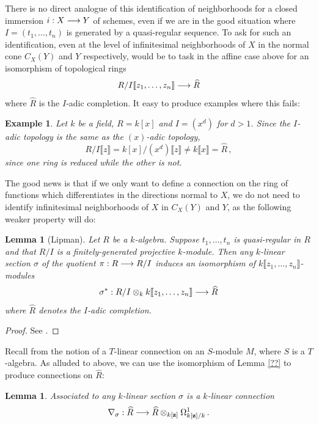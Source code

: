 \documentclass[english,letter paper,12pt,leqno]{article}
\newtheorem{lemma}[theorem]{Lemma}
\theoremstyle{example}
\newtheorem{example}[theorem]{Example}
\numberwithin{equation}{section}
\def\be{\begin{equation}}
\def\ee{\end{equation}}
\begin{document}
There is no direct analogue of this identification of neighborhoods for a closed immersion $i: X \longrightarrow Y$ of schemes, even if we are in the good situation where $I = (t_1,\ldots,t_n)$ is generated by a quasi-regular sequence. To ask for such an identification, even at the level of infinitesimal neighborhoods of $X$ in the normal cone $C_X(Y)$ and $Y$ respectively, would be to task in the affine case above for an isomorphism of topological rings
\[
R/I\llbracket z_1,\ldots,z_n \rrbracket \longrightarrow \widehat{R}
\]
where $\widehat{R}$ is the $I$-adic completion. It easy to produce examples where this fails:

\begin{example} Let $k$ be a field, $R = k[x]$ and $I = (x^d)$ for $d > 1$. Since the $I$-adic topology is the same as the $(x)$-adic topology, 
\[
R/I\llbracket z \rrbracket = k[x]/(x^d) \llbracket z \rrbracket \neq k\llbracket x \rrbracket = \widehat{R}\,,
\]
since one ring is reduced while the other is not.
\end{example}

The good news is that if we only want to define a connection on the ring of functions which differentiates in the directions normal to $X$, we do not need to identify infinitesimal neighborhoods of $X$ in $C_X(Y)$ and $Y$, as the following weaker property will do:

\begin{lemma}[Lipman] Let $R$ be a $k$-algebra. Suppose $t_1,\ldots,t_n$ is quasi-regular in $R$ and that $R/I$ is a finitely-generated projective $k$-module. Then any $k$-linear section $\sigma$ of the quotient $\pi: R \longrightarrow R/I$ induces an isomorphism of $k\llbracket z_1,\ldots,z_n \rrbracket$-modules
\[
\sigma^*: R/I \otimes_k k\llbracket z_1,\ldots,z_n \rrbracket \longrightarrow \widehat{R}
\]
where $\widehat{R}$ denotes the $I$-adic completion.
\end{lemma}
\begin{proof}
See \cite{??}.
\end{proof}

Recall from \cite{??} the notion of a $T$-linear connection on an $S$-module $M$, where $S$ is a $T$-algebra. As alluded to above, we can use the isomorphism of Lemma \ref{??} to produce connections on $\widehat{R}$:

\begin{lemma} Associated to any $k$-linear section $\sigma$ is a $k$-linear connection
\be
\nabla_\sigma: \widehat{R} \lto \widehat{R} \otimes_{k[\bold{z}]} \Omega^1_{k[\bold{z}]/k}\,.
\ee
\end{lemma}
\end{document}
